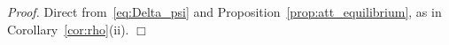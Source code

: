 \noindent\textit{Proof.} Direct from~\eqref{eq:Delta_psi} and Proposition~\ref{prop:att_equilibrium}, as in Corollary~\ref{cor:rho}(ii). $\Box$
